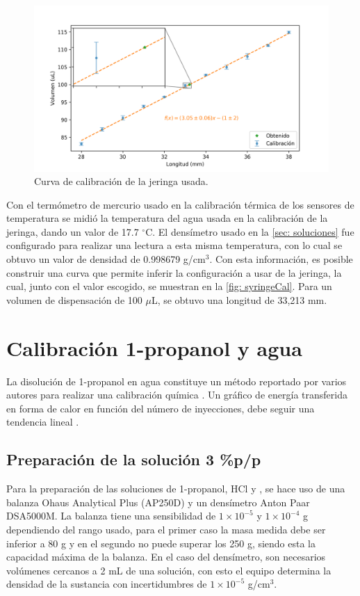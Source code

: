 	\begin{figure}[h!]
		\centering
		\includegraphics[width=\linewidth]{../Data/Syringe/syringe_cal.png}
		\caption{Curva de calibraci\'on de la jeringa usada.}
		\label{fig: syringeCal}
	\end{figure}
	
	Con el termómetro de mercurio usado en la calibración térmica de los sensores de temperatura se midió la temperatura del agua usada en la calibración de la jeringa, dando un valor de 17.7 $^\circ$C. El dens\'imetro usado en la \autoref{sec: soluciones} fue configurado para realizar una lectura a esta misma temperatura, con lo cual se obtuvo un valor de densidad de 0.998679 g/cm$^3$. Con esta información, es posible construir una curva que permite inferir la configuración a usar de la jeringa, la cual, junto con el valor escogido, se muestran en la \autoref{fig: syringeCal}. Para un volumen de dispensación de 100 $\mu$L, se obtuvo una longitud de 33,213 mm.	

\section{Calibraci\'on 1-propanol y agua}
	La disoluci\'on de 1-propanol en agua constituye un m\'etodo reportado por varios autores para realizar una calibraci\'on qu\'imica \cite{briggner1991test, nanoitc, demarse2011calibration, adao2012chemical}. Un gr\'afico de energ\'ia transferida en forma de calor en funci\'on del n\'umero de inyecciones, debe seguir una tendencia lineal \cite{demarse2011calibration, nanoitc, adao2012chemical}. 
	
\subsection{Preparaci\'on de la soluci\'on 3 \%p/p}
	Para la preparaci\'on de las soluciones de 1-propanol, HCl y , se hace uso de una balanza Ohaus Analytical Plus (AP250D) y un dens\'imetro Anton Paar DSA5000M. La balanza tiene una sensibilidad de $1\times10^{-5}$ y $1\times10^{-4}$ g dependiendo del rango usado, para el primer caso la masa medida debe ser inferior a 80 g y en el segundo no puede superar los 250 g, siendo esta la capacidad máxima de la balanza. En el caso del densímetro, son necesarios volúmenes cercanos a 2 mL de una soluci\'on, con esto el equipo determina la densidad de la sustancia con incertidumbres de $1\times10^{-5}$ g/cm$^{3}$.

